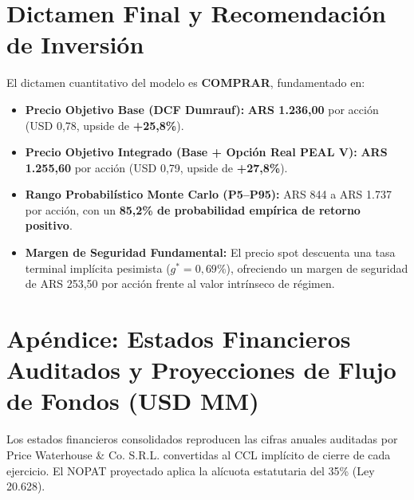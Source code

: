\documentclass[10pt,a4paper]{article}
\begin{document}
\section{Dictamen Final y Recomendación de Inversión}

El dictamen cuantitativo del modelo es \textbf{COMPRAR}, fundamentado en:
\begin{itemize}
    \item \textbf{Precio Objetivo Base (DCF Dumrauf):} \textbf{ARS 1.236,00} por acción (USD 0,78, upside de \textbf{+25,8\%}).
    \item \textbf{Precio Objetivo Integrado (Base + Opción Real PEAL V):} \textbf{ARS 1.255,60} por acción (USD 0,79, upside de \textbf{+27,8\%}).
    \item \textbf{Rango Probabilístico Monte Carlo (P5--P95):} ARS 844 a ARS 1.737 por acción, con un \textbf{85,2\% de probabilidad empírica de retorno positivo}.
    \item \textbf{Margen de Seguridad Fundamental:} El precio spot descuenta una tasa terminal implícita pesimista ($g^* = 0,69\%$), ofreciendo un margen de seguridad de ARS 253,50 por acción frente al valor intrínseco de régimen.
\end{itemize}

\clearpage

\section*{Apéndice: Estados Financieros Auditados y Proyecciones de Flujo de Fondos (USD MM)}

{\small Los estados financieros consolidados reproducen las cifras anuales auditadas por Price Waterhouse \& Co. S.R.L. convertidas al CCL implícito de cierre de cada ejercicio. El NOPAT proyectado aplica la alícuota estatutaria del 35\% (Ley 20.628).}
\end{document}
